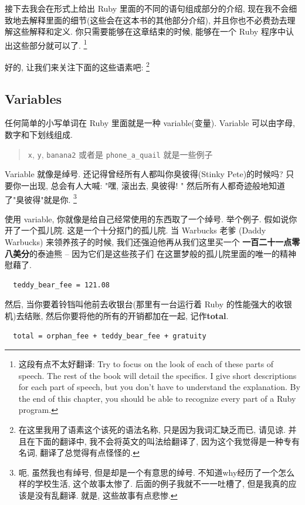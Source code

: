 接下去我会在形式上给出 Ruby 里面的不同的语句组成部分的介绍, 
现在我不会细致地去解释里面的细节(这些会在这本书的其他部分介绍), 
并且你也不必费劲去理解这些解释和定义. 你只需要能够在这章结束的时候, 
能够在一个 Ruby 程序中认出这些部分就可以了. 
\footnote{这段有点不太好翻译: Try to focus on the look of each of these parts of speech. The rest of the book will detail the specifics. I give short descriptions for each part of speech, but you don't have to understand the explanation. By the end of this chapter, you should be able to recognize every part of a Ruby program.}

好的, 让我们来关注下面的这些语素吧: 
\footnote{在这里我用了语素这个该死的语法名称, 只是因为我词汇缺乏而已, 请见谅. 并且在下面的翻译中, 我不会将英文的叫法给翻译了, 因为这个我觉得是一种专有名词, 翻译了总觉得有点怪怪的. }

\subsection*{Variables}
任何简单的小写单词在 Ruby 里面就是一种 variable(变量). 
Variable 可以由字母, 数字和下划线组成. 

\begin{quotation}
  \texttt{x}, \texttt{y}, \texttt{banana2}
  或者是 \texttt{phone_a_quail} 就是一些例子
\end{quotation}

Variable 就像是绰号. 还记得曾经所有人都叫你臭彼得(Stinky Pete)的时候吗?
只要你一出现, 总会有人大喊: "嘿, 滚出去, 臭彼得! " 
然后所有人都奇迹般地知道了"臭彼得"就是你. 
\footnote{呃, 虽然我也有绰号, 但是却是一个有意思的绰号. 不知道why经历了一个怎么样的学校生活, 这个故事太惨了. 后面的例子我就不一一吐槽了, 但是我真的应该是没有乱翻译. 就是, 这些故事有点悲惨. }

使用 variable, 你就像是给自己经常使用的东西取了一个绰号. 举个例子. 
假如说你开了一个孤儿院. 这是一个十分抠门的孤儿院. 当 Warbucks 老爹
(Daddy Warbucks) 来领养孩子的时候, 我们还强迫他再从我们这里买一个
\textbf{一百二十一点零八美分}的泰迪熊 -- 因为它们是这些孩子们
在这噩梦般的孤儿院里面的唯一的精神慰藉了. 

\begin{verbatim}
  teddy_bear_fee = 121.08
\end{verbatim}

然后, 当你要着铃铛叫他前去收银台(那里有一台运行着 Ruby 
的性能强大的收银机)去结账, 然后你要将他的所有的开销都加在一起, 
记作\textbf{total}. 

\begin{verbatim}
  total = orphan_fee + teddy_bear_fee + gratuity
\end{verbatim}


